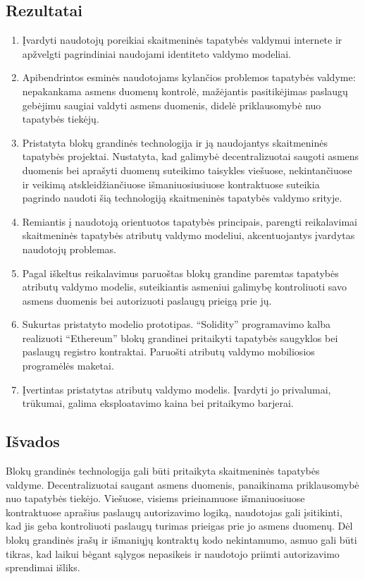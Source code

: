 
\subsection*{Rezultatai}

\begin{enumerate}
    \item Įvardyti naudotojų poreikiai skaitmeninės tapatybės valdymui internete ir apžvelgti
    pagrindiniai naudojami identiteto valdymo modeliai.
    \item Apibendrintos esminės naudotojams kylančios problemos tapatybės valdyme: nepakankama asmens duomenų
    kontrolė, mažėjantis pasitikėjimas paslaugų gebėjimu saugiai valdyti asmens duomenis, didelė priklausomybė nuo tapatybės tiekėjų.
    \item Pristatyta blokų grandinės technologija ir ją naudojantys skaitmeninės tapatybės projektai.
    Nustatyta, kad galimybė
    decentralizuotai saugoti asmens duomenis bei aprašyti duomenų suteikimo taisykles viešuose, nekintančiuose
    ir veikimą atskleidžiančiuose išmaniuosiusiuose
    kontraktuose suteikia pagrindo
    naudoti šią technologiją skaitmeninės tapatybės valdymo srityje. 
    \item Remiantis į naudotoją orientuotos tapatybės principais,
    parengti reikalavimai skaitmeninės tapatybės atributų valdymo modeliui, akcentuojantys įvardytas naudotojų problemas.
    \item Pagal iškeltus reikalavimus paruoštas blokų grandine paremtas tapatybės atributų valdymo modelis, suteikiantis asmeniui galimybę kontroliuoti savo asmens duomenis
    bei autorizuoti paslaugų prieigą prie jų.
    \item Sukurtas pristatyto modelio prototipas. \enquote{Solidity} programavimo kalba realizuoti \enquote{Ethereum} blokų grandinei pritaikyti
    tapatybės saugyklos bei paslaugų registro kontraktai. Paruošti atributų valdymo mobiliosios programėlės maketai.
    \item Įvertintas pristatytas atributų valdymo modelis. Įvardyti jo privalumai, trūkumai,
    galima eksploatavimo kaina bei pritaikymo barjerai.
\end{enumerate}

\subsection*{Išvados}

Blokų grandinės technologija gali būti pritaikyta skaitmeninės tapatybės valdyme. Decentralizuotai saugant asmens duomenis,
panaikinama priklausomybė nuo tapatybės tiekėjo. Viešuose, visiems prieinamuose
išmaniuosiuose kontraktuose aprašius paslaugų autorizavimo logiką, naudotojas gali įsitikinti,
kad jis geba kontroliuoti paslaugų turimas prieigas prie jo asmens duomenų. Dėl blokų grandinės įrašų ir išmaniųjų kontraktų kodo
nekintamumo, asmuo gali būti tikras, kad laikui bėgant sąlygos nepasikeis ir naudotojo priimti
autorizavimo sprendimai išliks.


